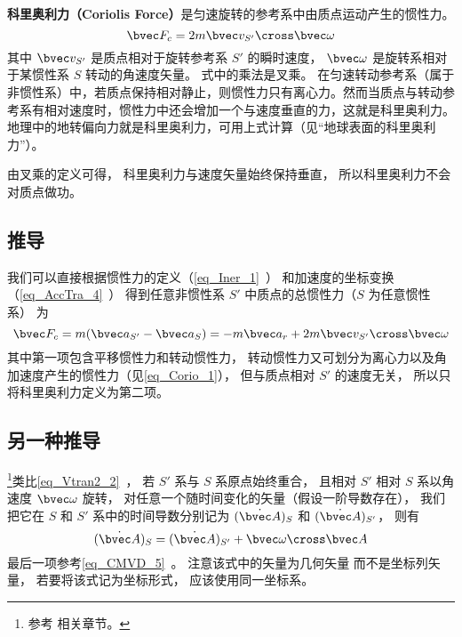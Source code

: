 

\textbf{科里奥利力（Coriolis Force）}是匀速旋转的参考系中由质点运动产生的惯性力。
\begin{equation}
\bvec F_c = 2m \bvec v_{S'} \cross \bvec \omega
\end{equation}
其中 $\bvec v_{S'}$ 是质点相对于旋转参考系 $S'$ 的瞬时速度， $\bvec\omega$ 是旋转系相对于某惯性系 $S$ 转动的角速度矢量。
式中的乘法是叉乘。
在匀速转动参考系（属于非惯性系）中，若质点保持相对静止，则惯性力只有离心力。然而当质点与转动参考系有相对速度时，惯性力中还会增加一个与速度垂直的力，这就是科里奥利力。地理中的地转偏向力就是科里奥利力，可用上式计算（见“地球表面的科里奥利力”）。

由叉乘的定义可得， 科里奥利力与速度矢量始终保持垂直， 所以科里奥利力不会对质点做功。

\subsection{推导}
我们可以直接根据惯性力的定义（\autoref{eq_Iner_1}~） 和加速度的坐标变换（\autoref{eq_AccTra_4}~） 得到任意非惯性系 $S'$ 中质点的总惯性力（$S$ 为任意惯性系） 为
\begin{equation}
\bvec F_c = m( \bvec a_{S'} - \bvec a_{S} ) = -m\bvec a_{r} + 2 m \bvec v_{S'} \cross  \bvec \omega
\end{equation}
其中第一项包含平移惯性力和转动惯性力， 转动惯性力又可划分为离心力以及角加速度产生的惯性力（见\autoref{eq_Corio_1}）， 但与质点相对 $S'$ 的速度无关， 所以只将科里奥利力定义为第二项。

\subsection{另一种推导}\label{sub_Corio_1}
\footnote{参考 \cite{Goldstein} 相关章节。}类比\autoref{eq_Vtran2_2}~， 若 $S'$ 系与 $S$ 系原点始终重合， 且相对 $S'$ 相对 $S$ 系以角速度 $\bvec\omega$ 旋转， 对任意一个随时间变化的矢量（假设一阶导数存在）， 我们把它在 $S$ 和 $S'$ 系中的时间导数分别记为 $(\dot{\bvec A})_{S}$ 和 $(\dot{\bvec A})_{S'}$， 则有
\begin{equation}\label{eq_Corio_4}
(\dot{\bvec A})_{S} = (\dot{\bvec A})_{S'} + \bvec\omega\cross\bvec A
\end{equation}
最后一项参考\autoref{eq_CMVD_5}~。 注意该式中的矢量为几何矢量 而不是坐标列矢量， 若要将该式记为坐标形式， 应该使用同一坐标系。

